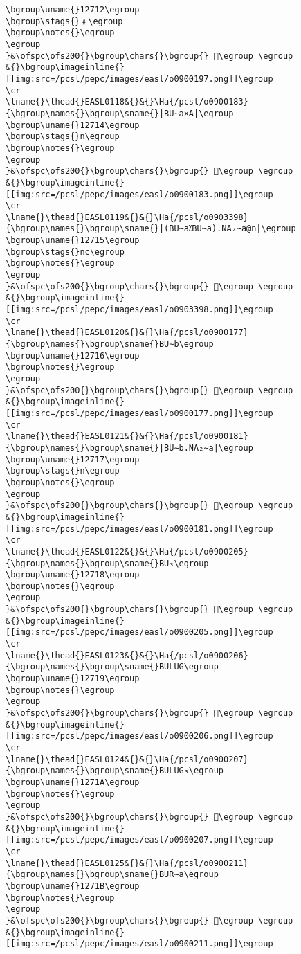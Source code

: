\begin{verbatim}
\bgroup\uname{}12712\egroup
\bgroup\stags{}﹟\egroup
\bgroup\notes{}\egroup
\egroup
}&\ofspc\ofs200{}\bgroup\chars{}\bgroup{} 𒜒\egroup \egroup
&{}\bgroup\imageinline{}[[img:src=/pcsl/pepc/images/easl/o0900197.png]]\egroup
\cr
\lname{}\thead{}EASL0118&{}&{}\Ha{/pcsl/o0900183}{\bgroup\names{}\bgroup\sname{}|BU∼a×A|\egroup
\bgroup\uname{}12714\egroup
\bgroup\stags{}n\egroup
\bgroup\notes{}\egroup
\egroup
}&\ofspc\ofs200{}\bgroup\chars{}\bgroup{} 𒜔\egroup \egroup
&{}\bgroup\imageinline{}[[img:src=/pcsl/pepc/images/easl/o0900183.png]]\egroup
\cr
\lname{}\thead{}EASL0119&{}&{}\Ha{/pcsl/o0903398}{\bgroup\names{}\bgroup\sname{}|(BU∼a⁒BU∼a).NA₂∼a@n|\egroup
\bgroup\uname{}12715\egroup
\bgroup\stags{}nc\egroup
\bgroup\notes{}\egroup
\egroup
}&\ofspc\ofs200{}\bgroup\chars{}\bgroup{} 𒜕\egroup \egroup
&{}\bgroup\imageinline{}[[img:src=/pcsl/pepc/images/easl/o0903398.png]]\egroup
\cr
\lname{}\thead{}EASL0120&{}&{}\Ha{/pcsl/o0900177}{\bgroup\names{}\bgroup\sname{}BU∼b\egroup
\bgroup\uname{}12716\egroup
\bgroup\notes{}\egroup
\egroup
}&\ofspc\ofs200{}\bgroup\chars{}\bgroup{} 𒜖\egroup \egroup
&{}\bgroup\imageinline{}[[img:src=/pcsl/pepc/images/easl/o0900177.png]]\egroup
\cr
\lname{}\thead{}EASL0121&{}&{}\Ha{/pcsl/o0900181}{\bgroup\names{}\bgroup\sname{}|BU∼b.NA₂∼a|\egroup
\bgroup\uname{}12717\egroup
\bgroup\stags{}n\egroup
\bgroup\notes{}\egroup
\egroup
}&\ofspc\ofs200{}\bgroup\chars{}\bgroup{} 𒜗\egroup \egroup
&{}\bgroup\imageinline{}[[img:src=/pcsl/pepc/images/easl/o0900181.png]]\egroup
\cr
\lname{}\thead{}EASL0122&{}&{}\Ha{/pcsl/o0900205}{\bgroup\names{}\bgroup\sname{}BU₃\egroup
\bgroup\uname{}12718\egroup
\bgroup\notes{}\egroup
\egroup
}&\ofspc\ofs200{}\bgroup\chars{}\bgroup{} 𒜘\egroup \egroup
&{}\bgroup\imageinline{}[[img:src=/pcsl/pepc/images/easl/o0900205.png]]\egroup
\cr
\lname{}\thead{}EASL0123&{}&{}\Ha{/pcsl/o0900206}{\bgroup\names{}\bgroup\sname{}BULUG\egroup
\bgroup\uname{}12719\egroup
\bgroup\notes{}\egroup
\egroup
}&\ofspc\ofs200{}\bgroup\chars{}\bgroup{} 𒜙\egroup \egroup
&{}\bgroup\imageinline{}[[img:src=/pcsl/pepc/images/easl/o0900206.png]]\egroup
\cr
\lname{}\thead{}EASL0124&{}&{}\Ha{/pcsl/o0900207}{\bgroup\names{}\bgroup\sname{}BULUG₃\egroup
\bgroup\uname{}1271A\egroup
\bgroup\notes{}\egroup
\egroup
}&\ofspc\ofs200{}\bgroup\chars{}\bgroup{} 𒜚\egroup \egroup
&{}\bgroup\imageinline{}[[img:src=/pcsl/pepc/images/easl/o0900207.png]]\egroup
\cr
\lname{}\thead{}EASL0125&{}&{}\Ha{/pcsl/o0900211}{\bgroup\names{}\bgroup\sname{}BUR∼a\egroup
\bgroup\uname{}1271B\egroup
\bgroup\notes{}\egroup
\egroup
}&\ofspc\ofs200{}\bgroup\chars{}\bgroup{} 𒜛\egroup \egroup
&{}\bgroup\imageinline{}[[img:src=/pcsl/pepc/images/easl/o0900211.png]]\egroup

\end{verbatim}
